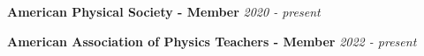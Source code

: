 {\bf American Physical Society - Member} \hfill \textit{2020 - present}

\vspace{\y}
{\bf American Association of Physics Teachers - Member} \hfill \textit{2022 - present}

\vspace{\y}